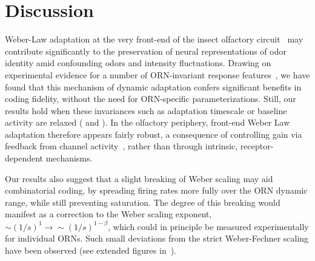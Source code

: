 \documentclass[9pt,lineno]{elife}
\begin{document}





\section{Discussion}


Weber-Law adaptation at the very front-end of the insect olfactory circuit~\citep{srinivas_elife,cafaro_WL,cao_WL} may contribute significantly to the preservation of neural representations of odor identity amid confounding odors and intensity fluctuations. Drawing on experimental evidence for a number of ORN-invariant response features~\citep{nagel_wilson_biophysical,martelli,stevens,srinivas_elife,si2017invariances}, we have found that this mechanism of dynamic adaptation confers significant benefits in coding fidelity, without the need for ORN-specific parameterizations. Still, our results hold when these invariances such as adaptation timescale or baseline activity are relaxed ( and ). In the olfactory periphery, front-end Weber Law adaptation therefore appears fairly robust, a consequence of controlling gain via feedback from channel activity~\citep{EmonetReview,nagel_wilson_biophysical,srinivas_elife}, rather than through intrinsic, receptor-dependent mechanisms. 

Our results also suggest that a slight breaking of Weber scaling may aid combinatorial coding, by spreading firing rates more fully over the ORN dynamic range, while still preventing saturation. The degree of this breaking would manifest as a correction to the Weber scaling exponent, $\sim(1/s)^1 \rightarrow \sim(1/s)^{1-\beta}$, which could in principle be measured experimentally for individual ORNs. Such small deviations from the strict Weber-Fechner scaling have been observed (see extended figures in~\citep{srinivas_elife}).
\end{document}
